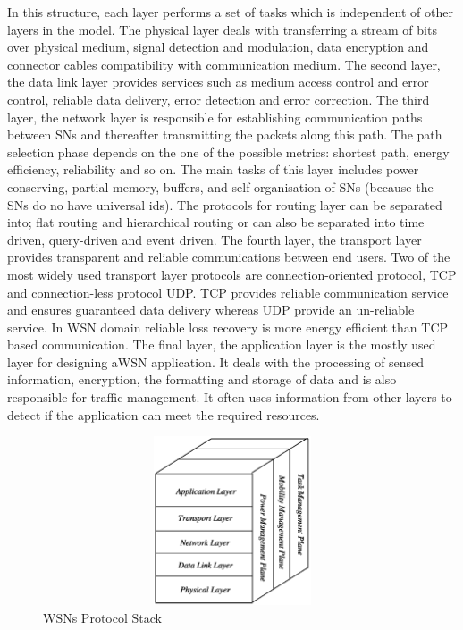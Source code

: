 In this structure, each layer performs a set of tasks which is independent of other layers in the model. The physical layer deals with transferring a stream of bits over physical medium, signal detection and modulation, data encryption and connector cables compatibility with communication medium. The second layer, the data link layer provides services such as medium access control and error control, reliable data delivery, error detection and error correction. The third layer, the network layer is responsible for establishing communication paths between \acp{SN} and thereafter transmitting the packets along this path. The path selection phase depends on the one of the possible metrics: shortest path, energy efficiency, reliability and so on. The main tasks of this layer includes power conserving, partial memory, buffers, and self-organisation of \acp{SN} (because the \acp{SN} do no have universal ids). The protocols for routing layer can be separated into; flat routing and hierarchical routing or can also be separated into time driven, query-driven and event driven. The fourth layer, the transport layer provides transparent and reliable communications between end users. Two of the most widely used transport layer protocols are connection-oriented protocol, \ac{TCP} and connection-less protocol \ac{UDP}. \ac{TCP} provides reliable communication service and ensures guaranteed data delivery whereas \ac{UDP} provide an un-reliable service. In \ac{WSN} domain reliable loss recovery is more energy efficient than \ac{TCP} based communication. The final layer, the application layer is the mostly used layer for designing a\ac{WSN} application. It deals with the processing of sensed information, encryption, the formatting and storage of data and is also responsible for traffic management. It often uses information from other layers to detect if the application can meet the required resources.

\begin{figure}
    \centering
    \includegraphics[width=1.0\textwidth,height=5cm]{Diagrams/Wireless-Sensor-Network-Architecture.png}
    \caption{\acp{WSN} Protocol Stack}
    \label{fig:Wireless-Sensor-Network-Architecture}
\end{figure}

